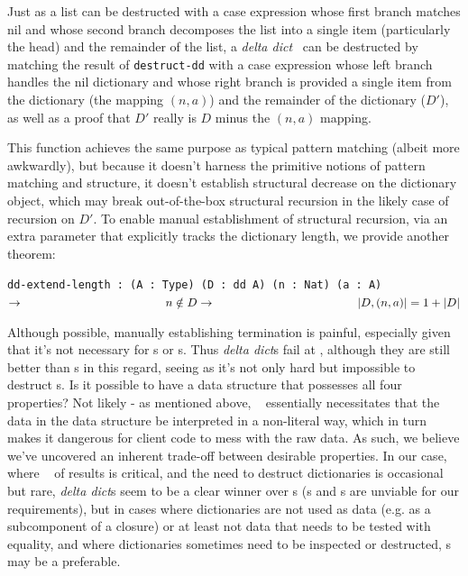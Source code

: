 \documentclass[nonacm]{acmart}
\newcommand{\dd}{\emph{delta dict}}
\theoremstyle{slplain}
\numberwithin{thm}{section}
\begin{document}
Just as a list can be destructed with a case expression whose first branch matches nil and whose second branch
decomposes the list into a single item (particularly the head) and the remainder of the list, a \dd~ can be
destructed by matching the result of \texttt{destruct-dd} with a case expression whose left branch handles the
nil dictionary and whose right branch is provided a single item from the dictionary (the mapping $(n, a)$)
and the remainder of the dictionary ($D'$), as well as a proof that $D'$ really is $D$ minus the $(n, a)$
mapping.

This function achieves the same purpose as typical pattern matching (albeit more awkwardly), but because it
doesn't harness the primitive notions of pattern matching and structure, it doesn't establish structural
decrease on the dictionary object, which may break out-of-the-box structural recursion in the likely case
of recursion on $D'$. To enable manual establishment of structural recursion, via an extra parameter that
explicitly tracks the dictionary length, we provide another theorem:

\texttt{dd-extend-length : (A : Type) (D : dd A) (n : Nat) (a : A) $\rightarrow \\
\phantom{xxxxxxxxxxxxxxxxxxxxx} n \notin D \rightarrow \\
\phantom{xxxxxxxxxxxxxxxxxxxxx} |D, (n, a)| = 1 + |D|$}

Although possible, manually establishing termination is painful, especially given that it's not necessary
for {\SAL}s or {\CAL}s. Thus {\dd}s fail at \EzDstr, although they are still better than {\FPF}s in this
regard, seeing as it's not only hard but impossible to destruct {\FPF}s. Is it possible to have a data
structure that possesses all four properties? Not likely - as mentioned above, \SemTot~ essentially
necessitates that the data in the data structure be interpreted in a non-literal way, which in turn
makes it dangerous for client code to mess with the raw data. As such, we believe we've uncovered an
inherent trade-off between desirable properties. In our case, where \EqDec~ of results is critical,
and the need to destruct dictionaries is occasional but rare, {\dd}s seem to be a clear winner over
{\CAL}s ({\SAL}s and {\FPF}s are unviable for our requirements), but in cases where dictionaries are
not used as data
(e.g. as a subcomponent of a closure) or at least not data that needs to be tested with equality, and
where dictionaries sometimes need to be inspected or destructed, {\CAL}s may be a preferable.
\end{document}
